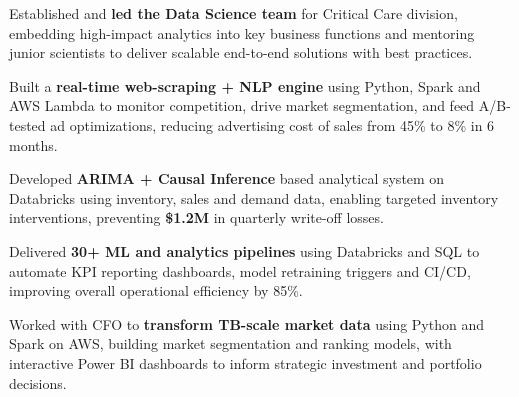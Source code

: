\documentclass[letterpaper,11pt]{article}
\newcommand{\resumeItem}[1]{
  \item{\small{#1}}
  \vspace{-2pt}
}
\begin{document}





    \resumeItem{Established and \textbf{led the Data Science team} for Critical Care division, embedding high-impact analytics into key business functions and mentoring junior scientists to deliver scalable end-to-end solutions with best practices.}


    \resumeItem{Built a \textbf{real-time web-scraping + NLP engine} using Python, Spark and AWS Lambda to monitor competition, drive market segmentation, and feed A/B-tested ad optimizations, reducing advertising cost of sales from 45\% to 8\% in 6 months.}

    \resumeItem{Developed \textbf{ARIMA + Causal Inference} based analytical system on Databricks using inventory, sales and demand data, enabling targeted inventory interventions, preventing \textbf{\$1.2M} in quarterly write-off losses.}

    \resumeItem{Delivered \textbf{30+ ML and analytics pipelines} using Databricks and SQL to automate KPI reporting dashboards, model retraining triggers and CI/CD, improving overall operational efficiency by 85\%.}

    
    \resumeItem{Worked with CFO to \textbf{transform TB-scale market data} using Python and Spark on AWS, building market segmentation and ranking models, with interactive Power BI dashboards to inform strategic investment and portfolio decisions.}
\end{document}
